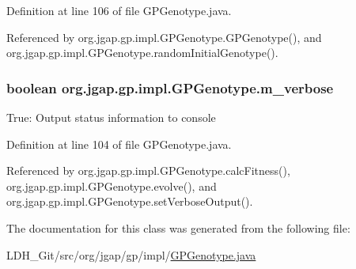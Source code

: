 Definition at line 106 of file G\-P\-Genotype.\-java.



Referenced by org.\-jgap.\-gp.\-impl.\-G\-P\-Genotype.\-G\-P\-Genotype(), and org.\-jgap.\-gp.\-impl.\-G\-P\-Genotype.\-random\-Initial\-Genotype().

\hypertarget{classorg_1_1jgap_1_1gp_1_1impl_1_1_g_p_genotype_ac5e56e43bba8e3368cacb3111a5fd60a}{
\subsubsection[{m\-\_\-verbose}]{\setlength{\rightskip}{0pt plus 5cm}boolean org.\-jgap.\-gp.\-impl.\-G\-P\-Genotype.\-m\-\_\-verbose\hspace{0.3cm}{\ttfamily [private]}}}\label{classorg_1_1jgap_1_1gp_1_1impl_1_1_g_p_genotype_ac5e56e43bba8e3368cacb3111a5fd60a}
True\-: Output status information to console 

Definition at line 104 of file G\-P\-Genotype.\-java.



Referenced by org.\-jgap.\-gp.\-impl.\-G\-P\-Genotype.\-calc\-Fitness(), org.\-jgap.\-gp.\-impl.\-G\-P\-Genotype.\-evolve(), and org.\-jgap.\-gp.\-impl.\-G\-P\-Genotype.\-set\-Verbose\-Output().



The documentation for this class was generated from the following file\-:\begin{DoxyCompactItemize}
\item 
L\-D\-H\-\_\-\-Git/src/org/jgap/gp/impl/\hyperlink{_g_p_genotype_8java}{G\-P\-Genotype.\-java}\end{DoxyCompactItemize}
